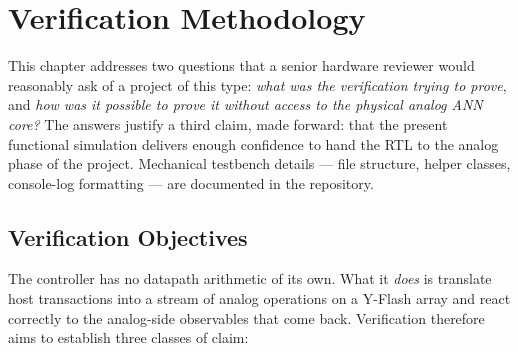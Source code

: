 
\chapter{Verification Methodology}
\label{ch:verification}

This chapter addresses two questions that a senior hardware reviewer
would reasonably ask of a project of this type: \emph{what was the
verification trying to prove}, and \emph{how was it possible to prove it
without access to the physical analog ANN core?} The answers justify a
third claim, made forward: that the present functional simulation
delivers enough confidence to hand the RTL to the analog phase of the
project. Mechanical testbench details --- file structure, helper
classes, console-log formatting --- are documented in the repository.

\section{Verification Objectives}
\label{sec:verif-goals}

The controller has no datapath arithmetic of its own. What it
\emph{does} is translate host transactions into a stream of analog
operations on a Y-Flash array and react correctly to the analog-side
observables that come back. Verification therefore aims to establish
three classes of claim:

